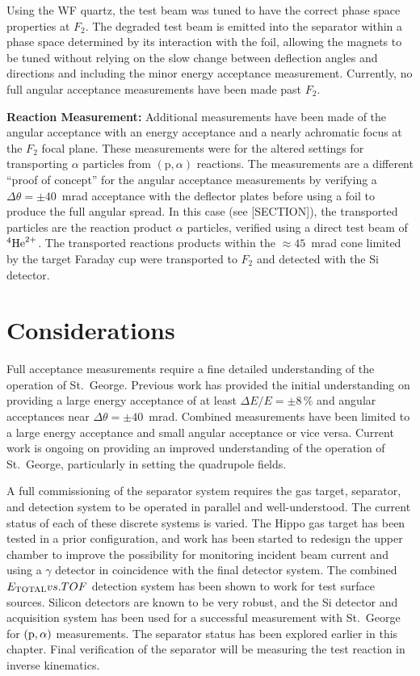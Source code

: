Using the WF quartz, the test beam was tuned to have the correct phase space
properties at $F_2$. The degraded test beam is emitted into the separator
within a phase space determined by its interaction with the foil, allowing the
magnets to be tuned without relying on the slow change between deflection
angles and directions and including the minor energy acceptance measurement.
Currently, no full angular acceptance measurements have been made past $F_2$.


\textbf{Reaction Measurement:}
Additional measurements have been made of the angular acceptance with an
energy acceptance and a nearly achromatic focus at the $F_2$ focal plane. These
measurements were for the altered settings for transporting $\alpha$ particles
from $(\textrm{p},\alpha)$ reactions. The measurements are a different ``proof
of concept'' for the angular acceptance measurements by verifying a
$\Delta\theta = \pm 40$~mrad acceptance with the deflector plates before using
a foil to produce the full angular spread. In this case (see [SECTION]), the
transported particles are the reaction product $\alpha$ particles, verified
using a direct test beam of ${}^{4}\textrm{He}^{2+}$. The transported reactions
products within the $\approx 45$~mrad cone limited by the target Faraday cup were
transported to $F_2$ and detected with the Si detector.


\section{Considerations}

Full acceptance measurements require a fine detailed understanding of the
operation of St.\ George. Previous work has provided the initial understanding
on providing a large energy acceptance of at least $\Delta E/E = \pm 8$\,\% and
angular acceptances near $\Delta\theta = \pm 40$~mrad. Combined measurements
have been limited to a large energy acceptance and small angular acceptance or
vice versa. Current work is ongoing on providing an improved understanding of
the operation of St.\ George, particularly in setting the quadrupole fields.

A full commissioning of the separator system requires the gas target,
separator, and detection system to be operated in parallel and well-understood.
The current status of each of these discrete systems is varied. The Hippo gas
target has been tested in a prior configuration, and work has been started to
redesign the upper chamber to improve the possibility for monitoring incident
beam current and using a $\gamma$ detector in coincidence with the final
detector system. The combined $E_{\rm{TOTAL}} vs. TOF$ detection system has
been shown to work for test surface sources. Silicon detectors are known to be
very robust, and the Si detector and acquisition system has been used for
a successful measurement with St.\ George for $(\rm{p},\alpha)$ measurements.
The separator status has been explored earlier in this chapter. Final
verification of the separator will be measuring the test reaction
 in inverse kinematics.

